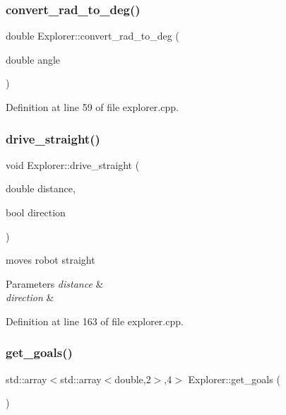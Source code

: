 \subsubsection{\texorpdfstring{convert\+\_\+rad\+\_\+to\+\_\+deg()}{convert\_rad\_to\_deg()}}
{\footnotesize\ttfamily double Explorer\+::convert\+\_\+rad\+\_\+to\+\_\+deg (\begin{DoxyParamCaption}\item[{double}]{angle }\end{DoxyParamCaption})}



Definition at line 59 of file explorer.\+cpp.

\mbox{\label{class_explorer_ab4ca9f16c48a60fc4d0e426b6fd9e9a0}} 
\subsubsection{\texorpdfstring{drive\+\_\+straight()}{drive\_straight()}}
{\footnotesize\ttfamily void Explorer\+::drive\+\_\+straight (\begin{DoxyParamCaption}\item[{double}]{distance,  }\item[{bool}]{direction }\end{DoxyParamCaption})}



moves robot straight 


\begin{DoxyParams}{Parameters}
{\em distance} & \\
\hline
{\em direction} & \\
\hline
\end{DoxyParams}


Definition at line 163 of file explorer.\+cpp.

\mbox{\label{class_explorer_a847e3ad2e7233d493a8dcfdd7139cb58}} 
\subsubsection{\texorpdfstring{get\+\_\+goals()}{get\_goals()}}
{\footnotesize\ttfamily std\+::array$<$std\+::array$<$double,2$>$,4$>$ Explorer\+::get\+\_\+goals (\begin{DoxyParamCaption}{ }\end{DoxyParamCaption})\hspace{0.3cm}{\ttfamily [inline]}}



